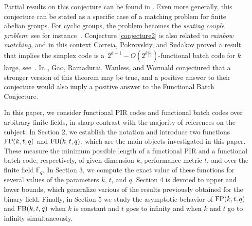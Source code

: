 \documentclass[11pt,a4paper]{article}
\theoremstyle{definition}
\newcommand{\F}{\mathbb F}
\newcommand{\ABK}[1]{{\color{orange} Altan: #1}}
\newcommand{\fb}{\textnormal{FB}}
\newcommand{\fp}{\textnormal{FP}}
\begin{document}
Partial results on this conjecture can be found in \cite{hollmann2023some,kovacs2023finding,yohananov2021almost}.
Even more generally, this conjecture can be stated as a specific case of a matching problem for finite abelian groups. For cyclic groups, the problem becomes the \textit{seating couple problem}; see for instance~\cite{karasev2012partitions,kohen2016generalization,kohen2010new,preissmann2009seating}. Conjecture \ref{conjecture2} is also related to \textit{rainbow matching}, and in this context Correia, Pokrovskiy, and Sudakov proved a result that implies the simplex code is a~$2^{k-1}-O(2^{k\frac{15}{16}})$-functional batch code for $k$ large, see~\cite[Theorem 1.2]{correia2023short}. In \cite{gao2021full}, Gao, Ramadurai, Wanless, and Wormald conjectured that a stronger version of this theorem may be true, and a positive answer to their conjecture would also imply a positive answer to the Functional Batch Conjecture.


In this paper, we consider functional PIR codes and functional batch codes over arbitrary finite fields, in sharp contrast with the majority of references on the subject. In Section 2, we establish the notation and  introduce two functions $\fp(k,t,q)$ and $\fb(k,t,q)$, which are the main objects investigated in this paper. 
These measure the minimum possible length of a functional PIR and a functional batch code, respectively, of given dimension $k$, performance metric $t$, and over the finite field $\F_q$.
In Section 3, we compute the exact value of these functions for several values of the parameters $k$, $t$, and $q$. Section 4 is devoted to upper and lower bounds, which generalize various of the results previously obtained for the binary field. Finally, in Section 5 we study the asymptotic behavior of $\fp(k,t,q)$ and $\fb(k,t,q)$ when $k$ is constant and $t$ goes to infinity and when $k$ and $t$ go to infinity simultaneously. 
\end{document}
